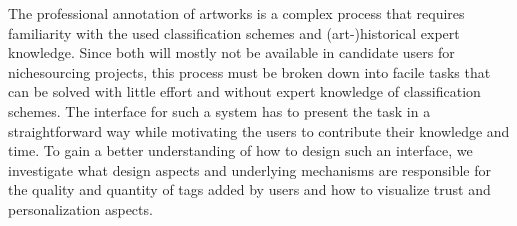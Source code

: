 The professional annotation of artworks is a complex process that requires familiarity with the used classification schemes and (art-)historical expert knowledge. 
Since both will mostly not be available in candidate users for nichesourcing projects, this process must be broken down into facile tasks that can be solved with little effort and without expert knowledge of classification schemes.
The interface for such a system has to present the task in a straightforward way while motivating the users to contribute their knowledge and time.
To gain a better understanding of how to design such an interface, we investigate what design aspects and underlying mechanisms are responsible for the quality and quantity of tags added by users and how to visualize trust and personalization aspects.

